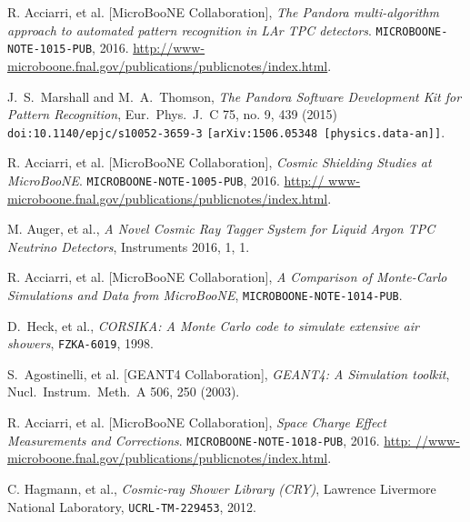 \documentclass[a4paper]{scrartcl}
\begin{document}
\begin{thebibliography}{9}

   R. Acciarri, et al. [MicroBooNE Collaboration], \textit{The Pandora multi-algorithm approach to automated pattern recognition in LAr TPC detectors}. \texttt{MICROBOONE- NOTE-1015-PUB}, 2016. \url{http://www-microboone.fnal.gov/publications/publicnotes/index.html}.

   J.~S.~Marshall and M.~A.~Thomson, \textit{The Pandora Software Development Kit for Pattern Recognition}, Eur.\ Phys.\ J.\ C 75, no. 9, 439 (2015) \texttt{doi:10.1140/epjc/s10052-3659-3} \texttt{[arXiv:1506.05348 [physics.data-an]]}.

   R. Acciarri, et al. [MicroBooNE Collaboration], \textit{Cosmic Shielding Studies at MicroBooNE}. \texttt{MICROBOONE-NOTE-1005-PUB}, 2016. \url{http:// www-microboone.fnal.gov/publications/publicnotes/index.html}.

   M. Auger, et al., \textit{A Novel Cosmic Ray Tagger System for Liquid Argon TPC Neutrino Detectors}, Instruments 2016, 1, 1.

   R. Acciarri, et al. [MicroBooNE Collaboration], \textit{A Comparison of Monte-Carlo Simulations and Data from MicroBooNE}, \texttt{MICROBOONE-NOTE-1014-PUB}.

   D.~Heck, et al.,
  \textit{CORSIKA: A Monte Carlo code to simulate extensive air showers},
  \texttt{FZKA-6019}, 1998.

   S.~Agostinelli, et al. [GEANT4 Collaboration], \textit{GEANT4: A Simulation toolkit}, Nucl.\ Instrum.\ Meth.\ A {506}, 250 (2003).

   R. Acciarri, et al. [MicroBooNE Collaboration], \textit{Space Charge Effect Measurements and Corrections}. \texttt{MICROBOONE-NOTE-1018-PUB}, 2016. \url{http: //www-microboone.fnal.gov/publications/publicnotes/index.html}.

   C. Hagmann, et al., \textit{Cosmic-ray Shower Library (CRY)},  Lawrence Livermore National Laboratory, \texttt{UCRL-TM-229453}, 2012.


\end{thebibliography}
\end{document}
